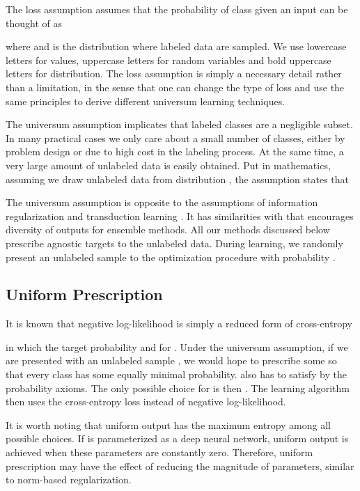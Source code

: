 \documentclass[letterpaper]{article}
\begin{document}
The loss assumption assumes that the probability of class  given an input  can be thought of as

where  and  is the distribution where labeled data are sampled. We use lowercase letters for values, uppercase letters for random variables and bold uppercase letters for distribution. The loss assumption is simply a necessary detail rather than a limitation, in the sense that one can change the type of loss and use the same principles to derive different universum learning techniques.

The universum assumption implicates that labeled classes are a negligible subset. In many practical cases we only care about a small number of classes, either by problem design or due to high cost in the labeling process. At the same time, a very large amount of unlabeled data is easily obtained. Put in mathematics, assuming we draw unlabeled data from distribution , the assumption states that


The universum assumption is opposite to the assumptions of information regularization \cite{CJ06} and transduction learning \cite{CSZ06T} \cite{GVV98}. It has similarities with \cite{ZZ10} that encourages diversity of outputs for ensemble methods. All our methods discussed below prescribe agnostic targets to the unlabeled data. During learning, we randomly present an unlabeled sample to the optimization procedure with probability .

\subsection{Uniform Prescription}
\label{sect:unif}

It is known that negative log-likelihood is simply a reduced form of cross-entropy

in which the target probability  and  for . Under the universum assumption, if we are presented with an unlabeled sample , we would hope to prescribe some  so that every class has some equally minimal probability.  also has to satisfy  by the probability axioms. The only possible choice for  is then . The learning algorithm then uses the cross-entropy loss instead of negative log-likelihood.

It is worth noting that uniform output has the maximum entropy among all possible choices. If  is parameterized as a deep neural network, uniform output is achieved when these parameters are constantly zero. Therefore, uniform prescription may have the effect of reducing the magnitude of parameters, similar to norm-based regularization.
\end{document}
